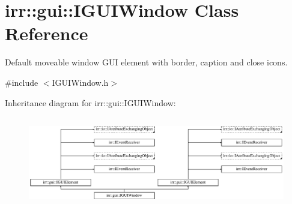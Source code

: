 \hypertarget{classirr_1_1gui_1_1IGUIWindow}{}\section{irr\+:\+:gui\+:\+:I\+G\+U\+I\+Window Class Reference}
\label{classirr_1_1gui_1_1IGUIWindow}


Default moveable window G\+UI element with border, caption and close icons.  




{\ttfamily \#include $<$I\+G\+U\+I\+Window.\+h$>$}

Inheritance diagram for irr\+:\+:gui\+:\+:I\+G\+U\+I\+Window\+:\begin{figure}[H]
\begin{center}
\leavevmode
\includegraphics[height=4.038462cm]{classirr_1_1gui_1_1IGUIWindow}
\end{center}
\end{figure}
